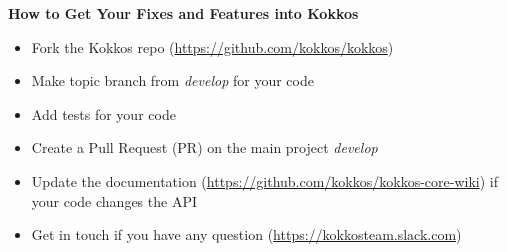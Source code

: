 










\begin{frame}[fragile]

  \vspace{10pt}

  \textbf{How to Get Your Fixes and Features into Kokkos}
  \newline
  \begin{itemize}
    \item Fork the Kokkos repo (\url{https://github.com/kokkos/kokkos})
    \item Make topic branch from \textit{develop} for your code
    \item Add tests for your code
    \item Create a Pull Request (PR) on the main project \textit{develop}
    \item Update the documentation (\url{https://github.com/kokkos/kokkos-core-wiki}) if your code changes the API
    \item Get in touch if you have any question (\url{https://kokkosteam.slack.com})
  \end{itemize}

\end{frame}



